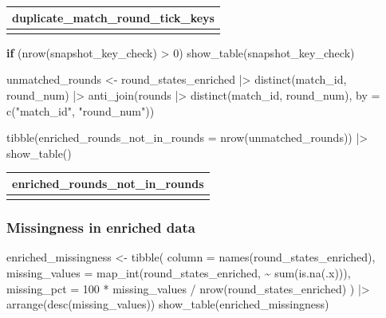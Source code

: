 \documentclass[
  letterpaper,
  DIV=11,
  numbers=noendperiod]{scrartcl}
\newenvironment{Shaded}{\begin{snugshade}}{\end{snugshade}}
\newcommand{\AttributeTok}[1]{\textcolor[rgb]{0.40,0.45,0.13}{#1}}
\newcommand{\ControlFlowTok}[1]{\textcolor[rgb]{0.00,0.23,0.31}{\textbf{#1}}}
\newcommand{\DecValTok}[1]{\textcolor[rgb]{0.68,0.00,0.00}{#1}}
\newcommand{\FunctionTok}[1]{\textcolor[rgb]{0.28,0.35,0.67}{#1}}
\newcommand{\NormalTok}[1]{\textcolor[rgb]{0.00,0.23,0.31}{#1}}
\newcommand{\OtherTok}[1]{\textcolor[rgb]{0.00,0.23,0.31}{#1}}
\newcommand{\SpecialCharTok}[1]{\textcolor[rgb]{0.37,0.37,0.37}{#1}}
\newcommand{\StringTok}[1]{\textcolor[rgb]{0.13,0.47,0.30}{#1}}
\newcounter{none} %
\begin{document}
{\def\LTcaptype{none} %
\begin{longtable}[]{@{}r@{}}
\toprule\noalign{}
duplicate\_match\_round\_tick\_keys \\
\midrule\noalign{}
\endhead
\bottomrule\noalign{}
\endlastfoot
0 \\
\end{longtable}
}

\begin{Shaded}
\begin{Highlighting}[]
\ControlFlowTok{if}\NormalTok{ (}\FunctionTok{nrow}\NormalTok{(snapshot\_key\_check) }\SpecialCharTok{\textgreater{}} \DecValTok{0}\NormalTok{) }\FunctionTok{show\_table}\NormalTok{(snapshot\_key\_check)}

\NormalTok{unmatched\_rounds }\OtherTok{\textless{}{-}}\NormalTok{ round\_states\_enriched }\SpecialCharTok{|\textgreater{}}
  \FunctionTok{distinct}\NormalTok{(match\_id, round\_num) }\SpecialCharTok{|\textgreater{}}
  \FunctionTok{anti\_join}\NormalTok{(rounds }\SpecialCharTok{|\textgreater{}} \FunctionTok{distinct}\NormalTok{(match\_id, round\_num),}
            \AttributeTok{by =} \FunctionTok{c}\NormalTok{(}\StringTok{"match\_id"}\NormalTok{, }\StringTok{"round\_num"}\NormalTok{))}

\FunctionTok{tibble}\NormalTok{(}\AttributeTok{enriched\_rounds\_not\_in\_rounds =} \FunctionTok{nrow}\NormalTok{(unmatched\_rounds)) }\SpecialCharTok{|\textgreater{}}
  \FunctionTok{show\_table}\NormalTok{()}
\end{Highlighting}
\end{Shaded}

{\def\LTcaptype{none} %
\begin{longtable}[]{@{}r@{}}
\toprule\noalign{}
enriched\_rounds\_not\_in\_rounds \\
\midrule\noalign{}
\endhead
\bottomrule\noalign{}
\endlastfoot
0 \\
\end{longtable}
}

\subsubsection{Missingness in enriched
data}\label{missingness-in-enriched-data}

\begin{Shaded}
\begin{Highlighting}[]
\NormalTok{enriched\_missingness }\OtherTok{\textless{}{-}} \FunctionTok{tibble}\NormalTok{(}
  \AttributeTok{column =} \FunctionTok{names}\NormalTok{(round\_states\_enriched),}
  \AttributeTok{missing\_values =} \FunctionTok{map\_int}\NormalTok{(round\_states\_enriched, }\SpecialCharTok{\textasciitilde{}} \FunctionTok{sum}\NormalTok{(}\FunctionTok{is.na}\NormalTok{(.x))),}
  \AttributeTok{missing\_pct =} \DecValTok{100} \SpecialCharTok{*}\NormalTok{ missing\_values }\SpecialCharTok{/} \FunctionTok{nrow}\NormalTok{(round\_states\_enriched)}
\NormalTok{) }\SpecialCharTok{|\textgreater{}}
  \FunctionTok{arrange}\NormalTok{(}\FunctionTok{desc}\NormalTok{(missing\_values))}
\FunctionTok{show\_table}\NormalTok{(enriched\_missingness)}
\end{Highlighting}
\end{Shaded}
\end{document}
